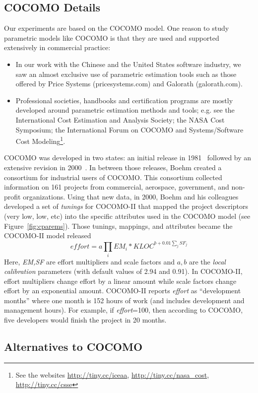 \documentclass[final,twocolumn,5p]{elsarticle}
\newcommand{\bi}{\begin{itemize}[leftmargin=0.4cm]}
\newcommand{\ei}{\end{itemize}}
\newcommand{\fig}[1]{Figure~\ref{fig:#1}}
\theoremstyle{break}
\begin{document}
  \subsection{COCOMO Details}
  Our experiments are based on the COCOMO model.
  One reason to study parametric models like COCOMO is that they are used and supported
extensively in commercial practice:
\bi
\item
In our work with the Chinese and the United States software industry,
we saw an   almost exclusive
use  of parametric estimation tools such as those offered by 
Price Systems (pricesystems.com) and  Galorath (galorath.com).
\item
Professional societies, handbooks and
certification programs are mostly developed around 
parametric estimation methods and tools; e.g. see the 
International Cost Estimation and Analysis Society; the
NASA Cost Symposium;  the
International Forum on COCOMO and Systems/Software
Cost Modeling\footnote{See the websites \url{http://tiny.cc/iceaa}, \url{http://tiny.cc/nasa_cost}, \url{http://tiny.cc/csse}}.
\ei
  COCOMO was developed in two states: an initial release in 1981~\cite{boehm81}
  followed by an extensive revision in  2000~\cite{boehm00b}.
  In between those releases,
  Boehm created a consortium for
industrial users of COCOMO.
This consortium
collected information on 161 projects from commercial,
aerospace, government, and non-profit organizations.
Using that new data, in 2000, Boehm and his colleagues developed
a set of   {\em tunings} for COCOMO-II that
mapped the project descriptors (very low, low, etc)
into the specific attributes used in the COCOMO model (see \fig{cparems}).
Those tunings, mappings, and attributes became the COCOMO-II model
released 
\begin{equation}\label{eq:cocII}
\mathit{effort}=a\prod_i EM_i *\mathit{KLOC}^{b+0.01\sum_j SF_j}
\end{equation}
Here, {\em EM,SF} are  effort multipliers and scale
factors and
 $a,b$ are the {\em local calibration} parameters (with default values of 2.94 and 0.91).
 In COCOMO-II, effort multipliers change effort by a linear amount
 while scale factors change effort by an exponential amount.
COCOMO-II reports {\em effort}
as ``development months'' where one month
is 152 hours of work  (and includes development and management hours).
For example, if {\em effort}=100, then according to COCOMO,
five developers would finish
the project in 20 months.




 \subsection{Alternatives to COCOMO}
\end{document}
